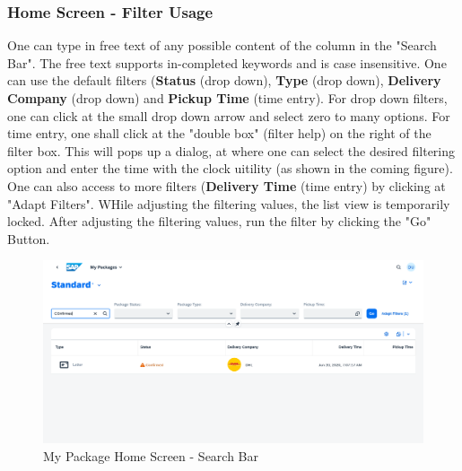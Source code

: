 \subsubsection{Home Screen - Filter Usage}
One can type in free text of any possible content of the column in the "Search Bar". The free text supports in-completed keywords and is case insensitive. One can use the default filters (\textbf{Status} (drop down), \textbf{Type} (drop down), \textbf{Delivery Company} (drop down) and \textbf{Pickup Time} (time entry). For drop down filters, one can click at the small drop down arrow and select zero to many options. For time entry, one shall click at the "double box" (filter help) on the right of the filter box. This will pops up a dialog, at where one can select the desired filtering option and enter the time with the clock uitility (as shown in the coming figure). One can also access to more filters (\textbf{Delivery Time} (time entry) by clicking at "Adapt Filters". WHile adjusting the filtering values, the list view is temporarily locked. After adjusting the filtering values, run the filter by clicking the "Go" Button.

\begin{figure}[H]
	\centering
	\includegraphics[width=1\linewidth]{images/user_doc/myPack/searchbar.png}
	\caption{My Package Home Screen - Search Bar}
	\label{fig:mpSearchBar}
\end{figure}


